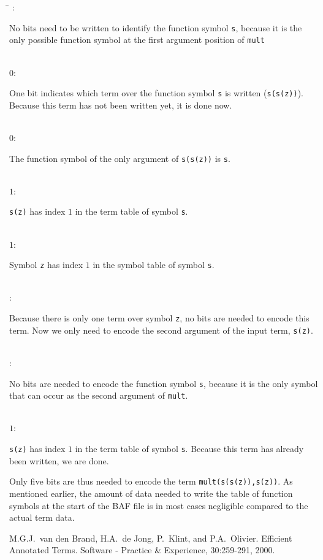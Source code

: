 \documentclass{article}
\newcommand{\tabline}[2]
{#1\>:
\begin{minipage}[t]{\textwidth-1.5cm}
#2
\end{minipage}}
\begin{document}
\begin{tabbing}
\hspace{1.5cm}\=\kill
\tabline{   }{No bits need to be written to identify the function symbol \texttt{s}, because it is the only
              possible function symbol at the first argument position of \texttt{mult}}\\
\tabline{$0$}{One bit indicates which term over the function symbol \texttt{s} is written (\texttt{s(s(z))}).
              Because this term has not been written yet, it is done now.}\\
\tabline{$0$}{The function symbol of the only argument of \texttt{s(s(z))} is \texttt{s}.}\\
\tabline{$1$}{\texttt{s(z)} has index $1$ in the term table of symbol \texttt{s}.}\\
\tabline{$1$}{Symbol \texttt{z} has index $1$ in the symbol table of symbol \texttt{s}.}\\
\tabline{   }{Because there is only one term over symbol \texttt{z}, no bits are needed to
              encode this term. Now we only need to encode the second argument of the input term, \texttt{s(z)}.}\\
\tabline{    }{No bits are needed to encode the function symbol \texttt{s}, because it is the only symbol that
               can occur as the second argument of \texttt{mult}.}\\
\tabline{$1$}{\texttt{s(z)} has index $1$ in the term table of symbol \texttt{s}. Because this term has already been
              written, we are done.}
\end{tabbing}

Only five bits are thus needed to encode the term \texttt{mult(s(s(z)),s(z))}. As mentioned earlier, the amount of data
needed to write the table of function symbols at the start of the BAF file is in most cases negligible compared to the
actual term data.

\begin{thebibliography}{1}
M.G.J.\ van den Brand, H.A.\ de Jong, P.\ Klint, and P.A.\ Olivier.
Efficient Annotated Terms. Software - Practice \& Experience, 30:259-291, 2000.
\end{thebibliography}
\end{document}
